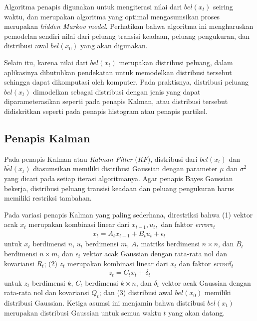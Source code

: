 Algoritma penapis digunakan untuk mengiterasi nilai dari $bel(x_t)$ seiring waktu, dan merupakan algoritma yang optimal mengasumsikan proses merupakan \textit{hidden Markov model}. Perhatikan bahwa algoritma ini mengharuskan pemodelan sendiri nilai dari peluang transisi keadaan, peluang pengukuran, dan distribusi awal $bel(x_0)$ yang akan digunakan.

Selain itu, karena nilai dari $bel(x_t)$ merupakan distribusi peluang, dalam aplikasinya dibutuhkan pendekatan untuk memodelkan distribusi tersebut sehingga dapat dikomputasi oleh komputer. Pada praktisnya, distribusi peluang $bel(x_t)$ dimodelkan sebagai distribusi dengan jenis yang dapat diparameterasikan seperti pada penapis Kalman, atau distribusi tersebut didiskritkan seperti pada penapis histogram atau penapis partikel.

\subsection{Penapis Kalman}

Pada penapis Kalman atau \textit{Kalman Filter} (\textit{KF}), distribusi dari $bel(x_t)$ dan $\overline{bel}(x_t)$ diasumsikan memiliki distribusi Gaussian dengan parameter $\mu$ dan $\sigma^2$ yang dicari pada setiap iterasi algoritmanya. Agar penapis Bayes Gaussian bekerja, distribusi peluang transisi keadaan dan peluang pengukuran harus memiliki restriksi tambahan.

Pada variasi penapis Kalman yang paling sederhana, direstriksi bahwa (1) vektor acak $x_t$ merupakan kombinasi linear dari $x_{t-1}, u_t,$ dan faktor \textit{error}$\epsilon_t$
\begin{align}
    x_t = A_t x_{t-1} + B_t u_t + \epsilon_t \,
\end{align}
untuk $x_t$ berdimensi $n$, $u_t$ berdimensi $m$, $A_t$ matriks berdimensi $n \times n$, dan $B_t$ berdimensi $n \times m$, dan $\epsilon_t$ vektor acak Gaussian dengan rata-rata nol dan kovariansi $R_t$; (2) $z_t$ merupakan kombinasi linear dari $x_t$ dan faktor \textit{error}$\delta_t$
\begin{align}
    z_t = C_t x_t + \delta_t
\end{align}
untuk $z_t$ berdimensi $k$, $C_t$ berdimensi $k \times n$, dan $\delta_t$ vektor acak Gaussian dengan rata-rata nol dan kovariansi $Q_t$; dan (3) distribusi awal $bel(x_0)$ memiliki distribusi Gaussian. Ketiga asumsi ini menjamin bahwa distribusi $bel(x_t)$ merupakan distribusi Gaussian untuk semua waktu $t$ yang akan datang.

